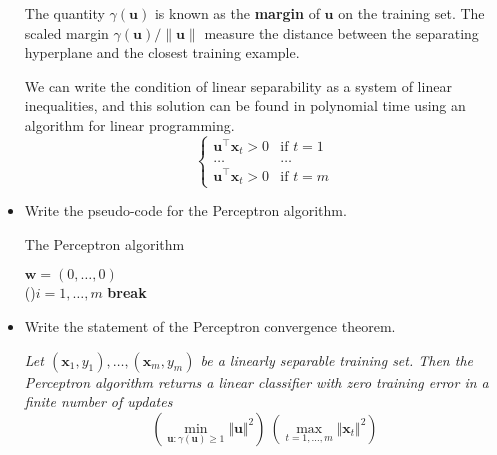 \begin{itemize}
        The quantity $\gamma(\boldsymbol{u})$ is known as the \textbf{margin} of $\boldsymbol{u}$ on the training set. The scaled margin $\gamma(\boldsymbol{u}) / \lVert\boldsymbol{u}\lVert$ measure the distance between the separating hyperplane and the closest training example.

        We can write the condition of linear separability as a system of linear inequalities, and this solution can be found in polynomial time using an algorithm for linear programming.\\
        $$
        \begin{cases}
            \boldsymbol{u}^{\top}\boldsymbol{x}_t > 0 & \text{if } t = 1\\
            \dots & \dots\\
            \boldsymbol{u}^{\top}\boldsymbol{x}_t > 0 & \text{if } t = m
        \end{cases}
        $$
    
    \item Write the pseudo-code for the Perceptron algorithm.\\

        \begin{algorithm}[H]
            \SetAlgoLined
            \DontPrintSemicolon
            \caption{The Perceptron algorithm}
            $\boldsymbol{w} = (0, \dots, 0)$\\
         {  
            \For(){$i = 1, \dots, m$}{
            }
             {
                \textbf{break}
            } 
           }
        \end{algorithm}

    \item Write the statement of the Perceptron convergence theorem.
    
        \textit{Let $(\boldsymbol{x}_1 , y_1 ), \dots, (\boldsymbol{x}_m , y_m)$ be a linearly separable training set. Then the Perceptron algorithm returns a linear classifier with zero training error in a finite number of updates}
        $$
        \left(\underset{\boldsymbol{u} : \gamma(\boldsymbol{u}) \geq 1}{\min} \Vert \boldsymbol{u} \Vert^2 \right) \ \left( \underset{t = 1, \dots, m}{\max} \Vert \boldsymbol{x}_t \Vert^2 \right)
        $$


\end{itemize}
